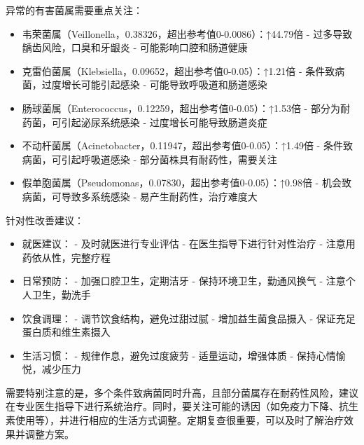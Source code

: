 \documentclass[UTF8]{ctexart}
\begin{document}
\begin{tcolorbox}[
    enhanced,
    colback=gray!3,
    colframe=gray!3,
    arc=3mm,
    boxrule=0pt,
    width=\textwidth,
    top=8pt,
    bottom=8pt
    ]
{\small{\textcolor{yellow!85!orange}{\faLightbulb}}\quad 异常的有害菌属需要重点关注：
\begin{itemize}
\item 韦荣菌属（Veillonella，0.38326，超出参考值0-0.0086）：↑44.79倍
    - 过多导致龋齿风险，口臭和牙龈炎
    - 可能影响口腔和肠道健康

\item 克雷伯菌属（Klebsiella，0.09652，超出参考值0-0.05）：↑1.21倍
    - 条件致病菌，过度增长可能引起感染
    - 可能导致呼吸道和肠道感染

\item 肠球菌属（Enterococcus，0.12259，超出参考值0-0.05）：↑1.53倍
    - 部分为耐药菌，可引起泌尿系统感染
    - 过度增长可能导致肠道炎症

\item 不动杆菌属（Acinetobacter，0.11947，超出参考值0-0.05）：↑1.49倍
    - 条件致病菌，可引起呼吸道感染
    - 部分菌株具有耐药性，需要关注

\item 假单胞菌属（Pseudomonas，0.07830，超出参考值0-0.05）：↑0.98倍
    - 机会致病菌，可导致多系统感染
    - 易产生耐药性，治疗难度大
\end{itemize}

{\textcolor{green!85!black}{\faLightbulb}}\quad 针对性改善建议：
\begin{itemize}
\item 就医建议：
    - 及时就医进行专业评估
    - 在医生指导下进行针对性治疗
    - 注意用药依从性，完整疗程

\item 日常预防：
    - 加强口腔卫生，定期洁牙
    - 保持环境卫生，勤通风换气
    - 注意个人卫生，勤洗手

\item 饮食调理：
    - 调节饮食结构，避免过甜过腻
    - 增加益生菌食品摄入
    - 保证充足蛋白质和维生素摄入

\item 生活习惯：
    - 规律作息，避免过度疲劳
    - 适量运动，增强体质
    - 保持心情愉悦，减少压力
\end{itemize}

需要特别注意的是，多个条件致病菌同时升高，且部分菌属存在耐药性风险，建议在专业医生指导下进行系统治疗。同时，要关注可能的诱因（如免疫力下降、抗生素使用等），并进行相应的生活方式调整。定期复查很重要，可以及时了解治疗效果并调整方案。
}
\end{tcolorbox}
\end{document}
